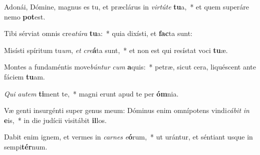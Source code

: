 \item Adonái, Dómine, magnus es tu, et præclárus in \textit{vir}\textit{tú}\textit{te} \textbf{tu}a,~* et quem superáre nemo \textbf{pot}est.
\item Tibi sérviat omnis cre\textit{a}\textit{tú}\textit{ra} \textbf{tu}a:~* quia dixísti, et \textbf{fac}ta sunt:
\item Misísti spíritum tu\textit{um}, \textit{et} \textit{cre}\textbf{á}ta sunt,~* et non est qui resístat voci \textbf{tu}æ.
\item Montes a fundaméntis move\textit{bún}\textit{tur} \textit{cum} \textbf{a}quis:~* petræ, sicut cera, liquéscent ante fáciem \textbf{tu}am.
\item \textit{Qui} \textit{au}\textit{tem} \textbf{ti}ment te,~* magni erunt apud te per \textbf{óm}nia.
\item Væ genti insurgénti super genus meum: Dóminus enim omnípotens vindi\textit{cá}\textit{bit} \textit{in} \textbf{e}is,~* in die judícii visitábit \textbf{il}los.
\item Dabit enim ignem, et vermes in \textit{car}\textit{nes} \textit{e}\textbf{ó}rum,~* ut urántur, et séntiant usque in sempi\textbf{tér}num.

